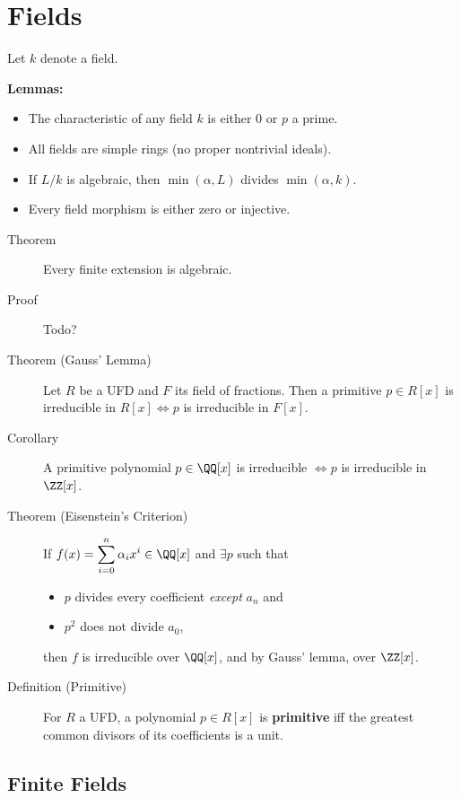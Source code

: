 \hypertarget{fields}{%
\section{Fields}\label{fields}}

Let \(k\) denote a field.

\textbf{Lemmas:}

\begin{itemize}
\tightlist
\item
  The characteristic of any field \(k\) is either 0 or \(p\) a prime.
\item
  All fields are simple rings (no proper nontrivial ideals).
\item
  If \(L/k\) is algebraic, then \(\min(\alpha, L)\) divides
  \(\min(\alpha, k)\).
\item
  Every field morphism is either zero or injective.
\end{itemize}

\begin{description}
\item[Theorem]
Every finite extension is algebraic.
\item[Proof]
Todo?
\item[Theorem (Gauss' Lemma)]
Let \(R\) be a UFD and \(F\) its field of fractions. Then a primitive
\(p\in R[x]\) is irreducible in \(R[x] \iff p\) is irreducible in
\(F[x]\).
\item[Corollary]
A primitive polynomial \(p\in \QQ[x]\) is irreducible \(\iff p\) is
irreducible in \(\ZZ[x]\).
\item[Theorem (Eisenstein's Criterion)]
If \(f(x) = \displaystyle\sum_{i=0}^n \alpha_i x^i \in \QQ[x]\) and
\(\exists p\) such that

\begin{itemize}
\tightlist
\item
  \(p\) divides every coefficient \emph{except} \(a_n\) and
\item
  \(p^2\) does not divide \(a_0\),
\end{itemize}

then \(f\) is irreducible over \(\QQ[x]\), and by Gauss' lemma, over
\(\ZZ[x]\).
\item[Definition (Primitive)]
For \(R\) a UFD, a polynomial \(p\in R[x]\) is \textbf{primitive} iff
the greatest common divisors of its coefficients is a unit.
\end{description}

\hypertarget{finite-fields}{%
\subsection{Finite Fields}\label{finite-fields}}

